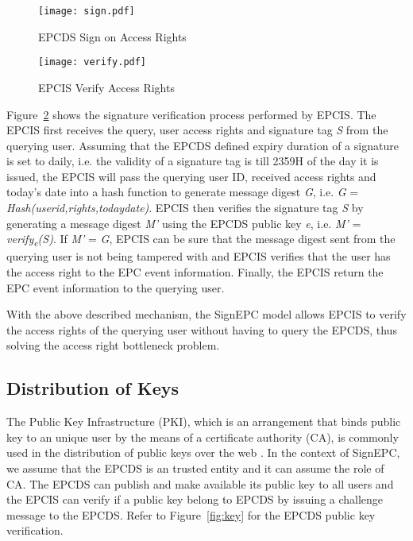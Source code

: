 \documentclass[conference]{IEEEtran}
\begin{document}
\begin{figure}[h]
\begin{center}
\texttt{[image: sign.pdf]}
\caption{EPCDS Sign on Access Rights \label{fig:sign}}
\end{center}
\end{figure}

\begin{figure}[h]
\begin{center}
\texttt{[image: verify.pdf]}
\caption{EPCIS Verify Access Rights \label{fig:verify}}
\end{center}
\end{figure}

Figure~\ref{fig:verify} shows the signature verification process performed by EPCIS. The EPCIS first receives the query, user access rights and signature tag \emph{S} from the querying user. Assuming that the EPCDS defined expiry duration of a signature is set to daily, i.e. the validity of a signature tag is till 2359H of the day it is issued, the EPCIS will pass the querying user ID, received access rights and today's date into a hash function to generate message digest \emph{G}, i.e. \emph{G} = \emph{Hash(userid,rights,todaydate)}. EPCIS then verifies the signature tag \emph{S} by generating a message digest \emph{M'} using the EPCDS public key \emph{e}, i.e. \emph{M'} = \emph{verify\textsubscript{e}(S)}.  If \emph{M'} = \emph{G}, EPCIS can be sure that the message digest sent from the querying user is not being tampered with and EPCIS verifies that the user has the access right to the EPC event information. Finally, the EPCIS return the EPC event information to the querying user.

With the above described mechanism, the SignEPC model allows EPCIS to verify the access rights of the querying user without having to query the EPCDS, thus solving the access right bottleneck problem.

\subsection {Distribution of Keys}
The Public Key Infrastructure (PKI), which is an arrangement that binds public key to an unique user by the means of a certificate authority (CA), is commonly used in the distribution of public keys over the web \cite{rfc:2560}. In the context of SignEPC, we assume that the EPCDS is an trusted entity and it can assume the role of CA. The EPCDS can publish and make available its public key to all users and the EPCIS can verify if a public key belong to EPCDS by issuing a challenge message to the EPCDS. Refer to Figure~\ref{fig:key} for the EPCDS public key verification.
\end{document}
